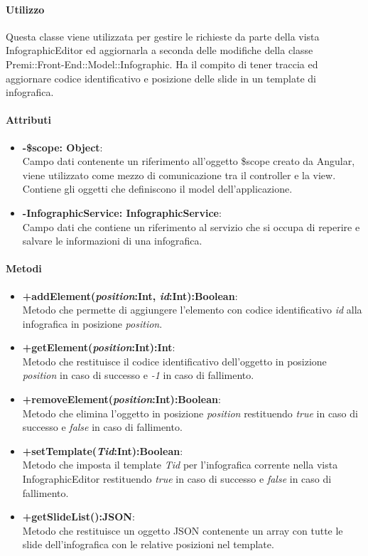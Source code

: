 	\paragraph{Utilizzo} 
	
		Questa classe viene utilizzata per gestire le richieste da parte della vista InfographicEditor ed aggiornarla a seconda delle modifiche della classe Premi::Front-End::Model::Infographic.
		Ha il compito di tener traccia ed aggiornare codice identificativo e posizione delle slide in un template di infografica.
	\paragraph{Attributi}
	\begin{itemize}
		\item \textbf{-\$scope: Object}:\\
			Campo dati contenente un riferimento all'oggetto \$scope creato da Angular, viene utilizzato come mezzo di comunicazione tra il controller e la view. Contiene gli oggetti che definiscono il model dell'applicazione.
		\item \textbf{-InfographicService: InfographicService}:\\
			Campo dati che contiene un riferimento al servizio che si occupa di reperire e salvare le informazioni di una infografica.
	\end{itemize}
	
	\paragraph{Metodi}
	\begin{itemize}
	  \item \textbf{+addElement(\textit{position}:Int, \textit{id}:Int):Boolean}:\\
		  Metodo che permette di aggiungere l'elemento con codice identificativo \textit{id} alla infografica in posizione \textit{position}.
	  \item \textbf{+getElement(\textit{position}:Int):Int}:\\
		  Metodo che restituisce il codice identificativo dell'oggetto in posizione \textit{position} in caso di successo e \textit{-1} in caso di fallimento.
	  \item \textbf{+removeElement(\textit{position}:Int):Boolean}:\\
		  Metodo che elimina l'oggetto in posizione \textit{position} restituendo \textit{true} in caso di successo e \textit{false} in caso di fallimento.
	  \item \textbf{+setTemplate(\textit{Tid}:Int):Boolean}:\\
		  Metodo che imposta il template \textit{Tid} per l'infografica corrente nella vista InfographicEditor restituendo \textit{true} in caso di successo e \textit{false} in caso di fallimento.
	  \item \textbf{+getSlideList():JSON}:\\
		  Metodo che restituisce un oggetto JSON contenente un array con tutte le slide dell'infografica con le relative posizioni nel template.
		  
	\end{itemize}
